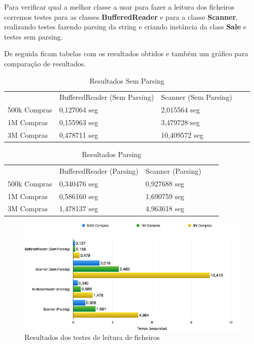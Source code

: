 \documentclass[10pt] {article}
\begin{document}
\par Para verificar qual a melhor classe a usar para fazer a leitura dos ficheiros corremos testes para as classes 
\textbf{BufferedReader} e para a classe \textbf{Scanner}, realizando testes fazendo parsing da string e criando instância 
da class \textbf{Sale} e testes sem parsing.
\par De seguida ficam tabelas com os resultados obtidos e também um gráfico para comparação de resultados.

\begin{table}[h]
\centering
\caption{Resultados Sem Parsing}
\label{my-label}
\begin{tabular}{l|l|l|ll}
\cline{2-3}
                                   & BufferedReader (Sem Parsing) & Scanner (Sem Parsing) &  &  \\ \cline{1-3}
\multicolumn{1}{|l|}{500k Compras} & 0,127064 seg                 & 2,015564 seg          &  &  \\ \cline{1-3}
\multicolumn{1}{|l|}{1M Compras}   & 0,155963 seg                 & 3,479728 seg          &  &  \\ \cline{1-3}
\multicolumn{1}{|l|}{3M Compras}   & 0,478711 seg                 & 10,409572 seg         &  &  \\ \cline{1-3}
\end{tabular}
\end{table}

\begin{table}[h]
\centering
\caption{Resultados Parsing}
\label{my-label}
\begin{tabular}{l|l|l|ll}
\cline{2-3}
                                   & BufferedReader (Parsing) & Scanner (Parsing) &  &  \\ \cline{1-3}
\multicolumn{1}{|l|}{500k Compras} & 0,340476 seg             & 0,927688 seg      &  &  \\ \cline{1-3}
\multicolumn{1}{|l|}{1M Compras}   & 0,586160 seg             & 1,690759 seg      &  &  \\ \cline{1-3}
\multicolumn{1}{|l|}{3M Compras}   & 1,478137 seg             & 4,963618 seg      &  &  \\ \cline{1-3}
\end{tabular}
\end{table}

\begin{figure}[ht!]
\centering
\includegraphics[width=150mm]{filegraph.png}
\caption{Resultados dos testes de leitura de ficheiros}
\label{fig:sales}
\end{figure}
\end{document}
